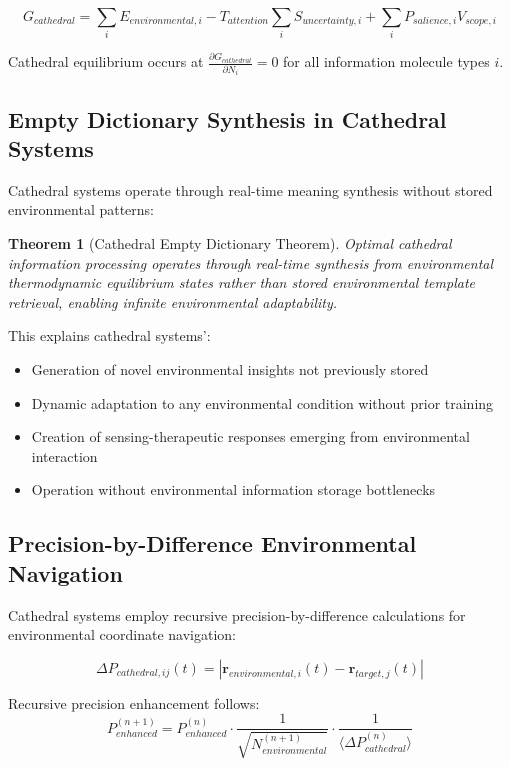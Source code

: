 \documentclass[12pt,a4paper]{article}
\newtheorem{theorem}{Theorem}
\begin{document}
\begin{equation}
G_{cathedral} = \sum_{i} E_{environmental,i} - T_{attention} \sum_{i} S_{uncertainty,i} + \sum_{i} P_{salience,i} V_{scope,i}
\end{equation}

Cathedral equilibrium occurs at $\frac{\partial G_{cathedral}}{\partial N_i} = 0$ for all information molecule types $i$.

\subsection{Empty Dictionary Synthesis in Cathedral Systems}

Cathedral systems operate through real-time meaning synthesis without stored environmental patterns:

\begin{theorem}[Cathedral Empty Dictionary Theorem]
Optimal cathedral information processing operates through real-time synthesis from environmental thermodynamic equilibrium states rather than stored environmental template retrieval, enabling infinite environmental adaptability.
\end{theorem}

This explains cathedral systems':
\begin{itemize}
\item Generation of novel environmental insights not previously stored
\item Dynamic adaptation to any environmental condition without prior training
\item Creation of sensing-therapeutic responses emerging from environmental interaction
\item Operation without environmental information storage bottlenecks
\end{itemize}

\subsection{Precision-by-Difference Environmental Navigation}

Cathedral systems employ recursive precision-by-difference calculations for environmental coordinate navigation:

\begin{equation}
\Delta P_{cathedral,ij}(t) = |\mathbf{r}_{environmental,i}(t) - \mathbf{r}_{target,j}(t)|
\end{equation}

Recursive precision enhancement follows:
\begin{equation}
P_{enhanced}^{(n+1)} = P_{enhanced}^{(n)} \cdot \frac{1}{\sqrt{N_{environmental}^{(n+1)}}} \cdot \frac{1}{\langle\Delta P_{cathedral}^{(n)}\rangle}
\end{equation}
\end{document}
